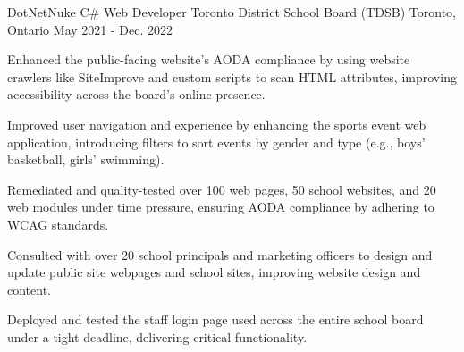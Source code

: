 \begin{cventries}
\cventry
  {DotNetNuke C\# Web Developer} %
  {Toronto District School Board (TDSB)} %
  {Toronto, Ontario} %
  {May 2021 - Dec. 2022} %
  { %
    \begin{cvitems}
      \item {Enhanced the public-facing website's AODA compliance by using website crawlers like SiteImprove and custom scripts to scan HTML attributes, improving accessibility across the board's online presence.}
      \item {Improved user navigation and experience by enhancing the sports event web application, introducing filters to sort events by gender and type (e.g., boys' basketball, girls' swimming).}
      \item {Remediated and quality-tested over 100 web pages, 50 school websites, and 20 web modules under time pressure, ensuring AODA compliance by adhering to WCAG standards.}
      \item {Consulted with over 20 school principals and marketing officers to design and update public site webpages and school sites, improving website design and content.}
      \item {Deployed and tested the staff login page used across the entire school board under a tight deadline, delivering critical functionality.}
    \end{cvitems}
  }


\end{cventries}
